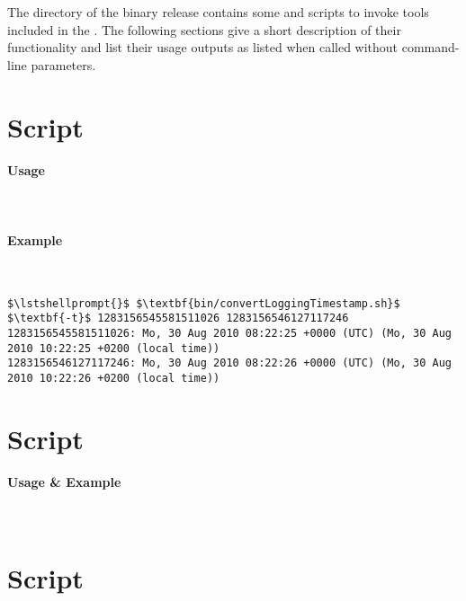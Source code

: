 The  directory of the binary release contains some   and %
 scripts to invoke tools included in the \mainJar{}. %
The following sections give a short description of their functionality and %
list their usage outputs as listed when called without command-line parameters. %


\section{Script }

\paragraph*{Usage}\

\setTextListing


\paragraph*{Example}\

\setTextListing
\begin{lstlisting}
$\lstshellprompt{}$ $\textbf{bin/convertLoggingTimestamp.sh}$ $\textbf{-t}$ 1283156545581511026 1283156546127117246 
1283156545581511026: Mo, 30 Aug 2010 08:22:25 +0000 (UTC) (Mo, 30 Aug 2010 10:22:25 +0200 (local time))
1283156546127117246: Mo, 30 Aug 2010 08:22:26 +0000 (UTC) (Mo, 30 Aug 2010 10:22:26 +0200 (local time))
\end{lstlisting}

\section{Script }

\paragraph*{Usage \& Example}\

\setTextListing


\section{Script }

